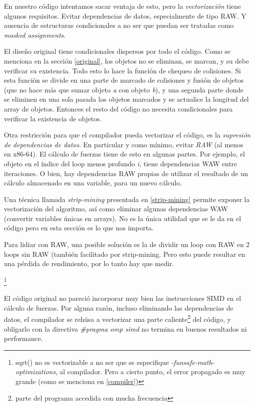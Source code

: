 \documentclass{article}
\begin{document}
En nuestro código intentamos sacar ventaja de esto, pero la \textit{vectorización} tiene algunos requisitos.
Evitar dependencias de datos, especialmente de tipo RAW. Y ausencia de estructuras condicionales a no ser
que puedan ser tratadas como \textit{masked assignments}.


El diseño original tiene condicionales dispersos por todo el código. Como se menciona en
la sección \ref{original}, los objetos no se eliminan, se marcan, y su debe verificar su existencia.
Todo esto lo hace la función de chequeo de colisiones. Si esta función se divide en una parte de marcado
de colisiones y fusión de objetos (que no hace más que sumar objeto \textit{a} con objeto \textit{b}), y
una segunda parte donde se eliminen en una sola pasada los objetos marcados y se actualice la longitud
del array de objetos. Entonces el resto del código no necesita condicionales para verificar la existencia de objetos.


Otra restricción para que el compilador pueda vectorizar el código, es la \textit{supresión de dependencias de datos}.
En particular y como mínimo, evitar \textit{RAW} (al menos en x86-64). El cálculo de fuerzas tiene de esto en algunas
partes. Por ejemplo, el objeto en el índice del loop menos profundo \textit{i}, tiene dependencias WAW entre iteraciones.
O bien, hay dependencias RAW propias de utilizar el resultado de un cálculo almacenado en una variable, para un nuevo cálculo.


Una técnica llamada \textit{strip-mining} presentada en \ref{strip-mining} permite exponer la vectorización
del algoritmo, así como eliminar algunas dependencias WAW (convertir variables únicas en arrays). No es
la única utilidad que se le da en el código pero en esta sección es lo que nos importa.


Para lidiar con RAW, una posible solución es la de dividir un loop con RAW en 2 loops sin RAW (también
facilitado por strip-mining. Pero esto puede resultar en una pérdida de rendimiento, por lo tanto
hay que medir.


\footnote{sqrt() no es vectorizable a no ser que se especifique \textit{-funsafe-math-optimizations},
al compilador. Pero a cierto punto, el error propagado es muy grande (como se menciona en \ref{compiler})}


El código original no pareció incorporar muy bien las instrucciones SIMD en el cálculo de fuerzas.
Por alguna razón, incluso eliminando las dependencias de datos, el compilador se rehúsa a vectorizar
una parte caliente\footnote{parte del programa accedida con mucha frecuencia} del código, y obligarlo
con la directiva \textit{\#pragma omp simd} no termina en buenos resultados ni performance.
\end{document}
